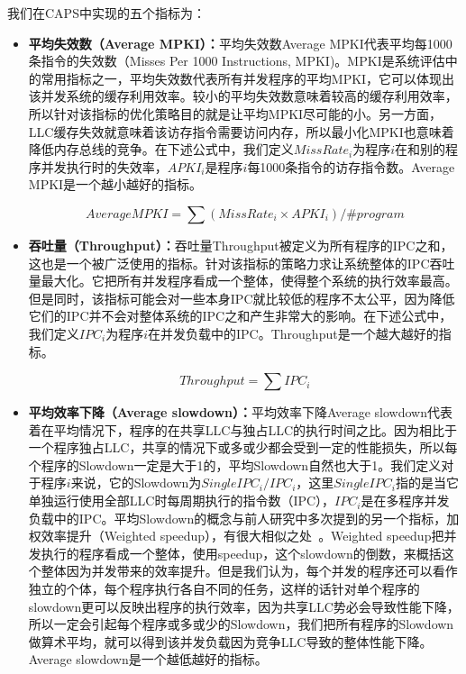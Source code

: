 我们在CAPS中实现的五个指标为：

\begin{itemize}

\item \textbf{平均失效数（Average MPKI）：}平均失效数Average MPKI代表平均每1000条指令的失效数（Misses Per 1000 Instructions, MPKI)。MPKI是系统评估中的常用指标之一，平均失效数代表所有并发程序的平均MPKI，它可以体现出该并发系统的缓存利用效率。较小的平均失效数意味着较高的缓存利用效率，所以针对该指标的优化策略目的就是让平均MPKI尽可能的小。另一方面，LLC缓存失效就意味着该访存指令需要访问内存，所以最小化MPKI也意味着降低内存总线的竞争。在下述公式中，我们定义$MissRate_i$为程序$i$在和别的程序并发执行时的失效率，$APKI_i$是程序$i$每1000条指令的访存指令数。Average MPKI是一个越小越好的指标。

\begin{equation}
AverageMPKI = \sum ( MissRate_i \times APKI_i ) / \#program
\label{eq:mn}
\end{equation}
	
\item \textbf{吞吐量（Throughput）：}吞吐量Throughput被定义为所有程序的IPC之和，这也是一个被广泛使用的指标。针对该指标的策略力求让系统整体的IPC吞吐量最大化。它把所有并发程序看成一个整体，使得整个系统的执行效率最高。但是同时，该指标可能会对一些本身IPC就比较低的程序不太公平，因为降低它们的IPC并不会对整体系统的IPC之和产生非常大的影响。在下述公式中，我们定义$IPC_i$为程序$i$在并发负载中的IPC。Throughput是一个越大越好的指标。

\begin{equation}
	Throughput = \sum IPC_i
	\label{eq:IPCsum}
\end{equation}

\item \textbf{平均效率下降（Average slowdown）：}平均效率下降Average slowdown代表着在平均情况下，程序的在共享LLC与独占LLC的执行时间之比。因为相比于一个程序独占LLC，共享的情况下或多或少都会受到一定的性能损失，所以每个程序的Slowdown一定是大于1的，平均Slowdown自然也大于1。我们定义对于程序$i$来说，它的Slowdown为$SingleIPC_i/IPC_i$，这里$SingleIPC_i$指的是当它单独运行使用全部LLC时每周期执行的指令数（IPC），$IPC_i$是在多程序并发负载中的IPC。平均Slowdown的概念与前人研究中多次提到的另一个指标，加权效率提升（Weighted speedup），有很大相似之处~\parencite{snavely2000symbiotic,qureshi2006utility}。Weighted speedup把并发执行的程序看成一个整体，使用speedup，这个slowdown的倒数，来概括这个整体因为并发带来的效率提升。但是我们认为，每个并发的程序还可以看作独立的个体，每个程序执行各自不同的任务，这样的话针对单个程序的slowdown更可以反映出程序的执行效率，因为共享LLC势必会导致性能下降，所以一定会引起每个程序或多或少的Slowdown，我们把所有程序的Slowdown做算术平均，就可以得到该并发负载因为竞争LLC导致的整体性能下降。Average slowdown是一个越低越好的指标。


\end{itemize}
